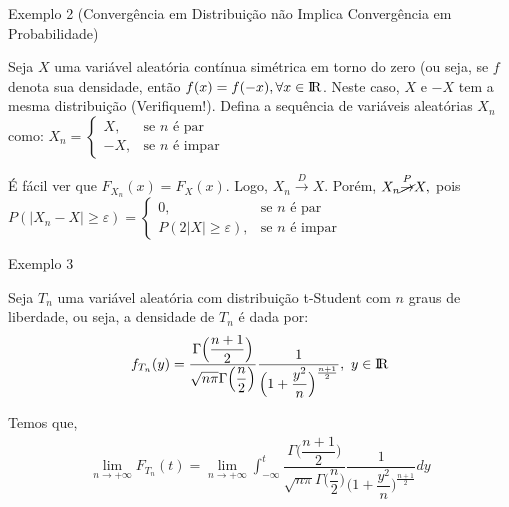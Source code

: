 \documentclass[12pt]{beamer}
\begin{document}
\begin{frame}{Exemplo 2 (Convergência em Distribuição não Implica Convergência em Probabilidade)}
\begin{block}{}
\justifying
Seja $X$ uma variável aleatória contínua simétrica em torno do zero (ou seja, se $f$ denota sua densidade, então $f(x) = f(-x), \forall x\in \rm I\!R$. Neste caso, $X$ e $-X$ tem a mesma distribuição (Verifiquem!). Defina a sequência de variáveis aleatórias $X_{n}$ como:
$X_{n} = \begin{cases} 
X, & \text{se $n$ é par} \\ 
-X, & \text{se $n$ é impar} 
\end{cases}$
\end{block}
\pause
\begin{block}{}
\justifying
É fácil ver que $F_{X_{n}}(x)=F_{X}(x).$ Logo, $X_{n} \overset{D}{\rightarrow} X.$ Porém, $X_{n} \overset{P}{\cancel{\rightarrow}} X,$ pois 
$P(|X_{n}-X|\geq\varepsilon) = \begin{cases} 
0, & \text{se $n$ é par} \\ 
P(2|X|\geq \varepsilon), & \text{se $n$ é impar}
\end{cases}$
\end{block}
\end{frame}

\begin{frame}{Exemplo 3}
\begin{block}{}
\justifying
Seja $T_{n}$ uma variável aleatória com distribuição t-Student com $n$ graus de liberdade, ou seja, a densidade de $T_{n}$ é dada por:
\begin{align*}
    f_{T_{n}}(y)=\dfrac{\Gamma\Big(\dfrac{n+1}{2}\Big)}{\sqrt{n\pi}\Gamma\Big(\dfrac{n}{2}\Big)}\dfrac{1}{\Big(1+\dfrac{y^{2}}{n}\Big)^{\frac{n+1}{2}}},~y\in \rm I\!R
\end{align*}
\end{block}
\pause
\begin{block}{}
\justifying
Temos que,
\begin{align*}
\lim_{n\rightarrow+\infty}F_{T_{n}}(t)=\lim_{n\rightarrow+\infty}\int_{-\infty}^{t}\dfrac{\Gamma\Big(\dfrac{n+1}{2}\Big)}{\sqrt{n\pi}\Gamma\Big(\dfrac{n}{2}\Big)}\dfrac{1}{\Big(1+\dfrac{y^{2}}{n}\Big)^{\frac{n+1}{2}}}dy
\end{align*}
\end{block}
\end{frame}
\end{document}
